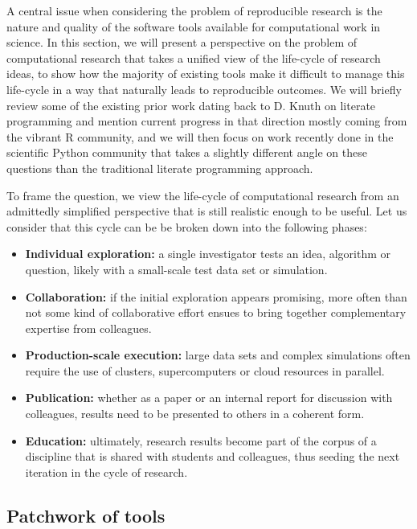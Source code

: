 \documentclass[ChapterTOCs,krantz2]{krantz} %
\begin{document}
A central issue when considering the problem of reproducible research is the
nature and quality of the software tools available for computational work in
science.  In this section, we will present a perspective on the problem of
computational research that takes a unified view of the life-cycle of research
ideas, to show how the majority of existing tools make it difficult to manage
this life-cycle in a way that naturally leads to reproducible outcomes.  We
will briefly review some of the existing prior work dating back to D. Knuth on
literate programming \cite{Knuth92} and mention current progress in that
direction mostly coming from the vibrant R community, and we will then focus on
work recently done in the scientific Python community that takes a slightly
different angle on these questions than the traditional literate programming
approach.

To frame the question, we view the life-cycle of computational research from an
admittedly simplified perspective that is still realistic enough to be
useful. Let us consider that this cycle can be be broken down into the
following phases:

\begin{itemize}
\item \textbf{Individual exploration:} a single investigator tests an idea,
  algorithm or question, likely with a small-scale test data set or simulation.
\item \textbf{Collaboration:} if the initial exploration appears promising,
  more often than not some kind of collaborative effort ensues to bring
  together complementary expertise from colleagues.
\item \textbf{Production-scale execution:} large data sets and complex
  simulations often require the use of clusters, supercomputers or cloud
  resources in parallel.
\item \textbf{Publication:} whether as a paper or an internal report for
  discussion with colleagues, results need to be presented to others in a
  coherent form.
\item \textbf{Education:} ultimately, research results become part of the
  corpus of a discipline that is shared with students and colleagues, thus
  seeding the next iteration in the cycle of research.
\end{itemize}

\subsection{Patchwork of tools}
\end{document}

